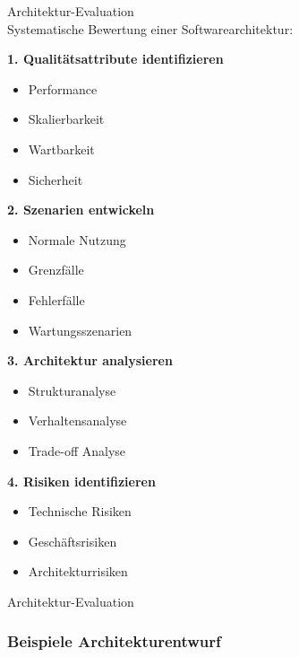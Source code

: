 \begin{KR}{Architektur-Evaluation}\\
Systematische Bewertung einer Softwarearchitektur:

\textbf{1. Qualitätsattribute identifizieren}
\begin{itemize}
    \item Performance
    \item Skalierbarkeit
    \item Wartbarkeit
    \item Sicherheit
\end{itemize}

\textbf{2. Szenarien entwickeln}
\begin{itemize}
    \item Normale Nutzung
    \item Grenzfälle
    \item Fehlerfälle
    \item Wartungsszenarien
\end{itemize}

\textbf{3. Architektur analysieren}
\begin{itemize}
    \item Strukturanalyse
    \item Verhaltensanalyse
    \item Trade-off Analyse
\end{itemize}

\textbf{4. Risiken identifizieren}
\begin{itemize}
    \item Technische Risiken
    \item Geschäftsrisiken
    \item Architekturrisiken
\end{itemize}
\end{KR}

\begin{example2}{Architektur-Evaluation}\\
\end{example2}

\subsubsection{Beispiele Architekturentwurf}

